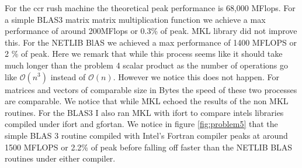 \documentclass[12pt]{article}
\theoremstyle{plain}
\theoremstyle{definition}
\begin{document}
For the ccr rush machine the theoretical peak performance is 68,000 MFlops. For a simple BLAS3 matrix matrix multiplication function we achieve a max performance of around 200MFlops or 0.3\% of peak. MKL library did not improve this. For the NETLIB BlAS we achieved a max performance of 1400 MFLOPS or 2 \% of peak. Here we remark that while this process seems like it should take much longer than the problem 4 scalar product as the number of operations go like $\mathcal{O}(n^3)$ instead of $\mathcal{O}(n)$. However we notice this does not happen. For matrices and vectors of comparable size in Bytes the speed of these two processes are comparable. We notice that while MKL echoed the results of the non MKL routines. For the BLAS3 I also ran MKL with ifort to compare intels libraries compiled under ifort and gfortan. We notice in figure \ref{fig:problem5} that the simple BLAS 3 routine compiled with Intel's Fortran compiler peaks at around 1500 MFLOPS or 2.2\% of peak before falling off faster than the NETLIB BLAS routines under either compiler.  
\end{document}
